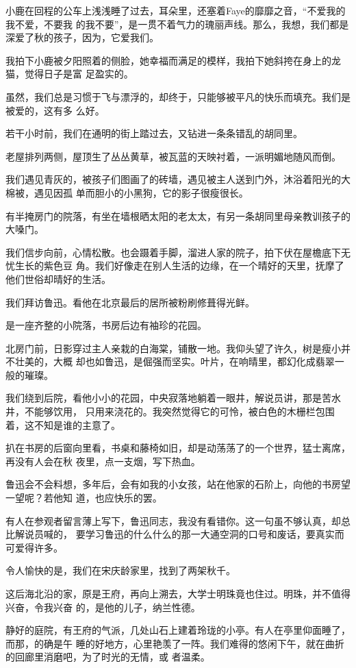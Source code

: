 		小鹿在回程的公车上浅浅睡了过去，耳朵里，还塞着Faye的靡靡之音，“不爱我的我不爱，不要我
	的我不要”，是一贯不着气力的瑰丽声线。那么，我想，我们都是深爱了秋的孩子，因为，它爱我们。

		我拍下小鹿被夕阳照着的侧脸，她幸福而满足的模样，我拍下她斜挎在身上的龙猫，觉得日子是富
	足盈实的。

		虽然，我们总是习惯于飞与漂浮的，却终于，只能够被平凡的快乐而填充。我们是被爱的，这有多
	么好。


		若干小时前，我们在通明的街上踏过去，又钻进一条条错乱的胡同里。

		老屋排列两侧，屋顶生了丛丛黄草，被瓦蓝的天映衬着，一派明媚地随风而倒。

		我们遇见青灰的，被孩子们图画了的砖墙，遇见被主人送到门外，沐浴着阳光的大棉被，遇见因孤
	单而胆小的小黑狗，它的影子很瘦很长。

		有半掩房门的院落，有坐在墙根晒太阳的老太太，有另一条胡同里母亲教训孩子的大嗓门。

		我们信步向前，心情松散。也会蹑着手脚，溜进人家的院子，拍下伏在屋檐底下无忧生长的紫色豆
	角。我们好像走在别人生活的边缘，在一个晴好的天里，抚摩了他们世俗却晴好的生活。


		我们拜访鲁迅。看他在北京最后的居所被粉刷修葺得光鲜。

		是一座齐整的小院落，书房后边有袖珍的花园。

		北房门前，日影穿过主人亲栽的白海棠，铺散一地。我仰头望了许久，树是瘦小并不壮美的，大概
	却也如鲁迅，是倔强而坚实。叶片，在响晴里，都幻化成翡翠一般的璀璨。

		我们绕到后院，看他小小的花园，中央寂落地躺着一眼井，解说员讲，那是苦水井，不能够饮用，
	只用来浇花的。我突然觉得它的可怜，被白色的木栅栏包围着，这不知是谁的主意了。

		扒在书房的后窗向里看，书桌和藤椅如旧，却是动荡荡了的一个世界，猛士离席，再没有人会在秋
	夜里，点一支烟，写下热血。

		鲁迅会不会料想，多年后，会有如我的小女孩，站在他家的石阶上，向他的书房望一望呢？若他知
	道，也应快乐的罢。


		有人在参观者留言薄上写下，鲁迅同志，我没有看错你。这一句虽不够认真，却总比解说员喊的，
	要学习鲁迅的什么什么的那一大通空洞的口号和废话，要真实而可爱得许多。


		令人愉快的是，我们在宋庆龄家里，找到了两架秋千。

		这后海北沿的家，原是王府，再向上溯去，大学士明珠竟也住过。明珠，并不值得兴奋，令我兴奋
	的，是他的儿子，纳兰性德。

		静好的庭院，有王府的气派，几处山石上建着玲珑的小亭。有人在亭里仰面睡了，而那，的确是午
	睡的好地方，心里艳羡了一阵。我们难得的悠闲下午，就在曲折的回廊里消磨吧，为了时光的无情，或
	者温柔。

